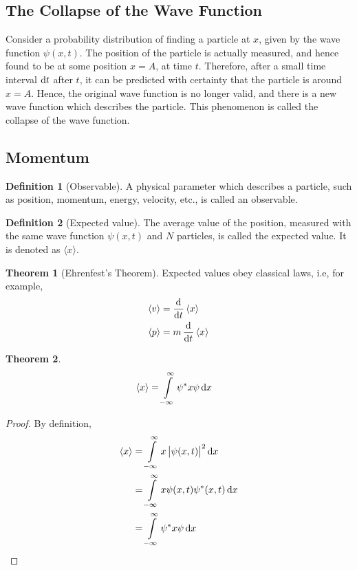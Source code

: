 \documentclass[titlepage, fleqn, a4paper, 12pt, twoside]{article}
\theoremstyle{definition}
\newtheorem{definition}{Definition}
\theoremstyle{theorem}
\newtheorem{theorem}{Theorem}
\begin{document}
\subsection{The Collapse of the Wave Function}

Consider a probability distribution of finding a particle at $x$, given by the wave function $\psi(x,t)$.
The position of the particle is actually measured, and hence found to be at some position $x = A$, at time $t$.
Therefore, after a small time interval $\dif t$ after $t$, it can be predicted with certainty that the particle is around $x = A$.
Hence, the original wave function is no longer valid, and there is a new wave function which describes the particle.
This phenomenon is called the collapse of the wave function.

\subsection{Momentum}

\begin{definition}[Observable]
	A physical parameter which describes a particle, such as position, momentum, energy, velocity, etc., is called an observable.
\end{definition}

\begin{definition}[Expected value]
	The average value of the position, measured with the same wave function $\psi(x,t)$ and $N$ particles, is called the expected value.
	It is denoted as $\langle x \rangle$.
\end{definition}

\begin{theorem}[Ehrenfest's Theorem]
	Expected values obey classical laws, i.e, for example,
	\begin{align*}
		\langle v \rangle & = \dod{}{t} \langle x \rangle   \\
		\langle p \rangle & = m \dod{}{t} \langle x \rangle \\
	\end{align*}
	\label{Ehrenfest's_Theorem}
\end{theorem}

\begin{theorem}
	\begin{align*}
		\langle x \rangle & = \int\limits_{-\infty}^{\infty} \psi^* x \psi \dif x
	\end{align*}
\end{theorem}

\begin{proof}
	By definition,
	\begin{align*}
		\langle x \rangle & = \int\limits_{-\infty}^{\infty} x \left| \psi(x,t) \right|^2 \dif x \\
                                  & = \int\limits_{-\infty}^{\infty} x \psi(x,t) \psi^*(x,t) \dif x      \\
                                  & = \int\limits_{-\infty}^{\infty} \psi^* x \psi \dif x
	\end{align*}
\end{proof}
\end{document}
